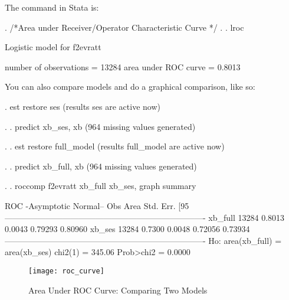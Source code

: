\documentclass[12pt]{article}
\begin{document}
The command in Stata is:

\begin{stlog}

. /*Area under Receiver/Operator Characteristic Curve */
. 
. lroc 

Logistic model for f2evratt

number of observations =    13284
area under ROC curve   =   0.8013

\end{stlog}

You can also compare models and do a graphical comparison, like so: 

\begin{stlog}

.   est restore ses
(results ses are active now)

. 
. predict xb_ses, xb
(964 missing values generated)

. 
. est restore full_model
(results full_model are active now)

. 
. predict xb_full, xb
(964 missing values generated)

.  
. roccomp f2evratt xb_full xb_ses, graph summary

                              ROC                    -Asymptotic Normal--
                   Obs       Area     Std. Err.      [95%
-------------------------------------------------------------------------
xb_full          13284     0.8013       0.0043        0.79293     0.80960
xb_ses           13284     0.7300       0.0048        0.72056     0.73934
-------------------------------------------------------------------------
Ho: area(xb_full) = area(xb_ses)
    chi2(1) =   345.06       Prob>chi2 =   0.0000

\end{stlog}


\begin{figure}
  \centering
  \caption{Area Under ROC Curve: Comparing Two Models}
 \texttt{[image: roc\_curve]}
  \label{fig:roccurve}
\end{figure}
\end{document}
